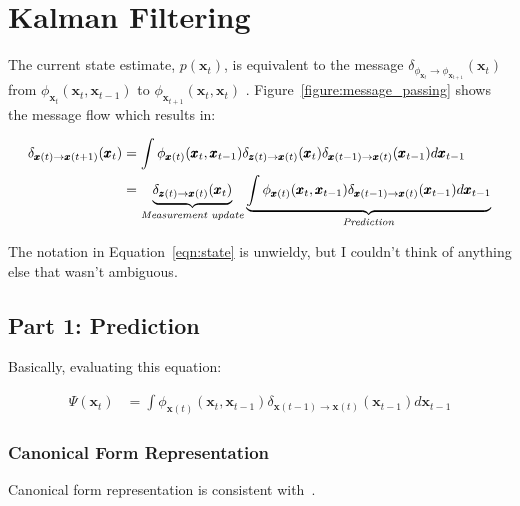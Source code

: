 \chapter{Kalman Filtering}
\label{chapter:filtering_equations}

The current state estimate, $p\left( \pmb{x}_{t} \right)$, is equivalent to the message $\delta_{\phi_{\pmb{x}_{t}} \rightarrow \phi_{\pmb{x}_{t+1}}}(\pmb{x}_{t})$ from $\phi_{\pmb{x}_{t}}(\pmb{x}_{t}, \pmb{x}_{t-1})$ to $\phi_{\pmb{x}_{t+1}}(\pmb{x}_{t}, \pmb{x}_{t})$ . Figure~\ref{figure:message_passing} shows the message flow which results in:



\begin{align}
\delta_{\pmb{x}(t) \rightarrow \pmb{x}(t+1)}(\pmb{x}_{t}) &= \int \phi_{\pmb{x}(t)}(\pmb{x}_{t}, \pmb{x}_{t-1}) \delta_{\pmb{z}(t) \rightarrow \pmb{x}(t)} (\pmb{x}_{t})  \delta_{\pmb{x}(t-1) \rightarrow \pmb{x}(t)} (\pmb{x}_{t-1}) d\pmb{x}_{t-1} \nonumber \\
&= \underbrace{ \delta_{\pmb{z}(t) \rightarrow \pmb{x}(t)} (\pmb{x}_{t}) }_\text{\textit{Measurement update}} \underbrace{ \int \phi_{\pmb{x}(t)}(\pmb{x}_{t}, \pmb{x}_{t-1})  \delta_{\pmb{x}(t-1) \rightarrow \pmb{x}(t)} (\pmb{x}_{t-1}) d\pmb{x}_{t-1} }_\text{\textit{Prediction}} \label{eqn:state}
\end{align}

\begin{remark}
The notation in Equation~\ref{eqn:state} is unwieldy, but I couldn't think of anything else that wasn't ambiguous.
\end{remark}

\section{Part 1: Prediction}
\label{section:prediction}
Basically, evaluating this equation:

\begin{align}
\Psi(\pmb{x}_{t}) &= \int \phi_{\pmb{x}(t)}(\pmb{x}_{t}, \pmb{x}_{t-1})  \delta_{\pmb{x}(t-1) \rightarrow \pmb{x}(t)} (\pmb{x}_{t-1}) d\pmb{x}_{t-1}  \label{eqn:rec_bel}
\end{align}

\subsection{Canonical Form Representation}
\label{subsection:canonical}
Canonical form representation is consistent with~\cite{Koller_canonical}.


